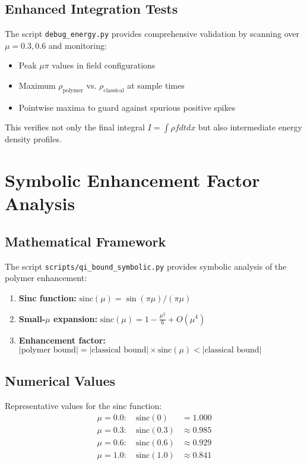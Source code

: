 \documentclass[11pt]{article}
\begin{document}
\subsection{Enhanced Integration Tests}
The script \texttt{debug\_energy.py} provides comprehensive validation by scanning over $\mu = 0.3, 0.6$ and monitoring:
\begin{itemize}
\item Peak $\mu\pi$ values in field configurations
\item Maximum $\rho_{\text{polymer}}$ vs. $\rho_{\text{classical}}$ at sample times
\item Pointwise maxima to guard against spurious positive spikes
\end{itemize}

This verifies not only the final integral $I = \int\rho f dt dx$ but also intermediate energy density profiles.

\section{Symbolic Enhancement Factor Analysis}

\subsection{Mathematical Framework}
The script \texttt{scripts/qi\_bound\_symbolic.py} provides symbolic analysis of the polymer enhancement:

\begin{enumerate}
\item \textbf{Sinc function:} $\text{sinc}(\mu) = \sin(\pi\mu)/(\pi\mu)$
\item \textbf{Small-$\mu$ expansion:} $\text{sinc}(\mu) = 1 - \frac{\mu^2}{6} + O(\mu^4)$
\item \textbf{Enhancement factor:} $|\text{polymer bound}| = |\text{classical bound}| \times \text{sinc}(\mu) < |\text{classical bound}|$
\end{enumerate}

\subsection{Numerical Values}
Representative values for the sinc function:
\begin{align}
\mu = 0.0: \quad \text{sinc}(0) &= 1.000 \\
\mu = 0.3: \quad \text{sinc}(0.3) &\approx 0.985 \\
\mu = 0.6: \quad \text{sinc}(0.6) &\approx 0.929 \\
\mu = 1.0: \quad \text{sinc}(1.0) &\approx 0.841
\end{align}
\end{document}
